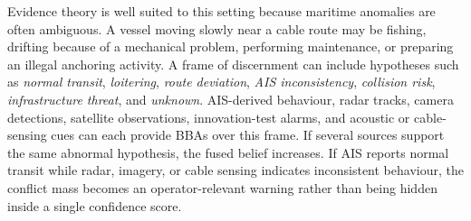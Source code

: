 Evidence theory is well suited to this setting because maritime anomalies are often ambiguous. A vessel moving slowly near a cable route may be fishing, drifting because of a mechanical problem, performing maintenance, or preparing an illegal anchoring activity. A frame of discernment can include hypotheses such as \emph{normal transit}, \emph{loitering}, \emph{route deviation}, \emph{AIS inconsistency}, \emph{collision risk}, \emph{infrastructure threat}, and \emph{unknown}. AIS-derived behaviour, radar tracks, camera detections, satellite observations, innovation-test alarms, and acoustic or cable-sensing cues can each provide BBAs over this frame. If several sources support the same abnormal hypothesis, the fused belief increases. If AIS reports normal transit while radar, imagery, or cable sensing indicates inconsistent behaviour, the conflict mass becomes an operator-relevant warning rather than being hidden inside a single confidence score.
